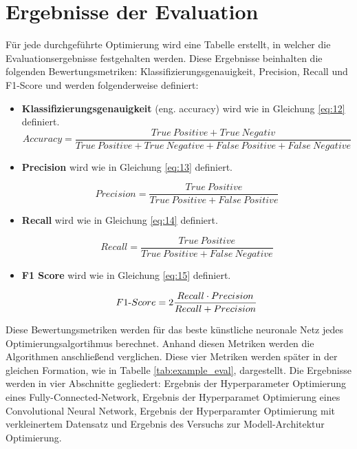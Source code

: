 \section{Ergebnisse der Evaluation}
Für jede durchgeführte Optimierung wird eine Tabelle erstellt, in welcher die Evaluationsergebnisse festgehalten werden. Diese Ergebnisse beinhalten die folgenden Bewertungsmetriken: Klassifizierungsgenauigkeit, Precision, Recall und F1-Score und werden folgenderweise definiert:
\begin{itemize}
\item \textbf{Klassifizierungsgenauigkeit}
(eng. accuracy) wird wie in Gleichung \ref{eq:12} definiert.
\begin{equation}
Accuracy = \frac{True\ Positive + True \ Negativ}{True\ Positive + True\ Negative + False\ Positive + False\ Negative}
\label{eq:12}
\end{equation}

\item \textbf{Precision} wird wie in Gleichung \ref{eq:13} definiert. 

\begin{equation}
Precision = \frac{True\ Positive}{True\ Positive + False\ Positive} \label{eq:13}
\end{equation} 

\item \textbf{Recall} wird wie in Gleichung \ref{eq:14} definiert. 

\begin{equation}
Recall = \frac{True\ Positive}{True\ Positive + False\ Negative} \label{eq:14}
\end{equation} 

\item \textbf{F1 Score} wird wie in Gleichung \ref{eq:15} definiert. 

\begin{equation}
F1{\text -}Score = 2\frac{Recall\cdot Precision}{Recall+Precision}\label{eq:15}
\end{equation} 
\end{itemize}

Diese Bewertungsmetriken werden für das beste künstliche neuronale Netz jedes Optimierungsalgortihmus berechnet. Anhand diesen Metriken werden die Algorithmen anschließend verglichen. Diese vier Metriken werden später in der gleichen Formation, wie in Tabelle \ref{tab:example_eval}, dargestellt. Die Ergebnisse werden in vier Abschnitte gegliedert: Ergebnis der Hyperparameter Optimierung eines Fully-Connected-Network, Ergebnis der Hyperparamet Optimierung eines Convolutional Neural Network, Ergebnis der Hyperparamter Optimierung mit verkleinertem Datensatz und Ergebnis des Versuchs zur Modell-Architektur Optimierung.


